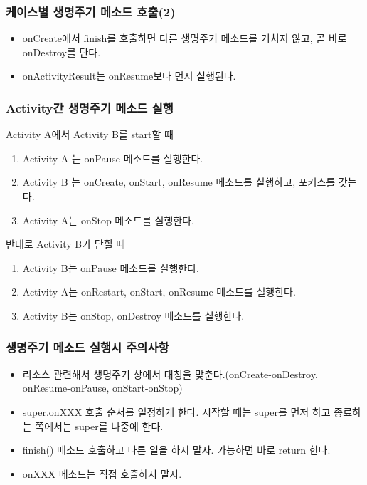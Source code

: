 \documentclass{beamer}
\begin{document}
\begin{frame}
\frametitle{케이스별 생명주기 메소드 호출(2)}
\begin{itemize}
\item onCreate에서 finish를 호출하면 다른 생명주기 메소드를 거치지 않고, 곧 바로 onDestroy를 탄다.
\item onActivityResult는 onResume보다 먼저 실행된다.
\end{itemize}
\end{frame}

\begin{frame}
\frametitle{Activity간 생명주기 메소드 실행}
\begin{block}{Activity A에서 Activity B를 start할 때}
\begin{enumerate}
\item Activity A 는 onPause 메소드를 실행한다.
\item Activity B 는 onCreate, onStart, onResume 메소드를 실행하고, 포커스를 갖는다.
\item Activity A는 onStop 메소드를 실행한다.
\end{enumerate}
\end{block}
\begin{block}{반대로 Activity B가 닫힐 때}
\begin{enumerate}
\item Activity B는 onPause 메소드를 실행한다.
\item Activity A는 onRestart, onStart, onResume 메소드를 실행한다.
\item Activity B는 onStop, onDestroy 메소드를 실행한다.
\end{enumerate}
\end{block}
\end{frame}

\begin{frame}
\frametitle{생명주기 메소드 실행시 주의사항}
\begin{itemize}
\item 리소스 관련해서 생명주기 상에서 대칭을 맞춘다.(onCreate-onDestroy, onResume-onPause, onStart-onStop)
\item super.onXXX 호출 순서를 일정하게 한다. 시작할 때는 super를 먼저 하고 종료하는 쪽에서는 super를 나중에 한다.
\item finish() 메소드 호출하고 다른 일을 하지 말자. 가능하면 바로 return 한다. 
\item onXXX 메소드는 직접 호출하지 말자.
\end{itemize}
\end{frame}
\end{document}
